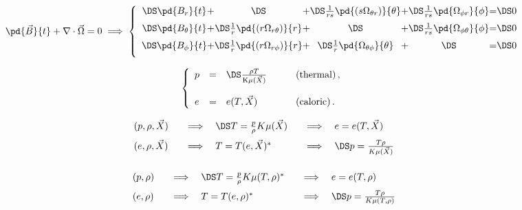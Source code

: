 \documentclass{article}
\begin{document}
\[    \pd{\vec{B}}{t} + \nabla\cdot\vec{\Omega} = 0
     \; \Longrightarrow \;
     \left\{\begin{array}{c@{+}c@{+}c@{+}c@{=}c}
     \DS \pd{B_{r}}{t}                                       & \DS
                                                        & \DS
     \frac{1}{rs}  \pd{(s \Omega_{\theta r})}{\theta} & \DS
     \frac{1}{rs}  \pd{\Omega_{\phi r}}{\phi}         & \DS 0
     \\ \noalign{\medskip}
     \DS \pd{B_{\theta}}{t}                      & \DS
     \frac{1}{r} \pd{(r\Omega_{r\theta})}{r}      & \DS
                                              & \DS
     \frac{1}{rs}\pd{\Omega_{\phi\theta}}{\phi}   & \DS 0
     \\ \noalign{\medskip}
     \DS \pd{B_{\phi}}{t}                          & \DS
     \frac{1}{r} \pd{(r\Omega_{r\phi})}{r}          & \DS
     \frac{1}{r} \pd{  \Omega_{\theta\phi}}{\theta} & \DS
                                              & \DS 0
     \\ \noalign{\medskip}
     \end{array}\right.
\]
\pagebreak

\[ \left\{\begin{array}{lcll}
 p &=&\DS \frac{\rho T}{{\rm K}\mu(\vec{X})} &\qquad\rm{(thermal)}\,,
   \\ \noalign{\bigskip}
 e &=&    e(T,\vec{X}) &\qquad\rm{(caloric)}\,.
 \end{array}\right.
\]
\pagebreak

\[ \begin{array}{lll}
        (p,\rho,\vec{X}) &\quad\Longrightarrow\quad \DS T = \frac{p}{\rho}K\mu(\vec{X}) 
          &\quad\Longrightarrow\quad e = e(T,\vec{X})   
          \\ \noalign{\medskip}
      (e,\rho,\vec{X}) &\quad\Longrightarrow\quad T = T(e,\vec{X})^* 
          &\quad\Longrightarrow\quad \DS p = \frac{T\rho}{K\mu(\vec{X})} 
          \\ \noalign{\medskip}
        \end{array}
\]
\pagebreak

\[ \begin{array}{lll}
    (p,\rho) &\quad\Longrightarrow\quad \DS T = \frac{p}{\rho}K\mu(T,\rho)^*
            &\quad\Longrightarrow\quad e = e(T,\rho)
          \\ \noalign{\medskip}
 (e,\rho) &\quad\Longrightarrow\quad T = T(e,\rho)^*
          &\quad\Longrightarrow\quad \DS p = \frac{T\rho}{K\mu(T,\rho)} 
          \\ \noalign{\medskip}
\end{array}
\]
\pagebreak
\end{document}
